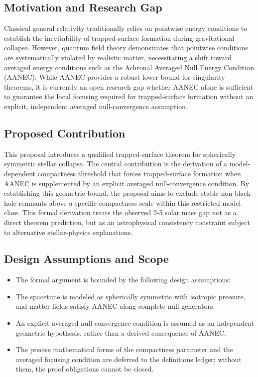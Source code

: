 \documentclass[conference]{IEEEtran}
\begin{document}
\subsection{Motivation and Research Gap}
Classical general relativity traditionally relies on pointwise energy conditions to establish the inevitability of trapped-surface formation during gravitational collapse. However, quantum field theory demonstrates that pointwise conditions are systematically violated by realistic matter, necessitating a shift toward averaged energy conditions such as the Achronal Averaged Null Energy Condition (AANEC). While AANEC provides a robust lower bound for singularity theorems, it is currently an open research gap whether AANEC alone is sufficient to guarantee the local focusing required for trapped-surface formation without an explicit, independent averaged null-convergence assumption.~\cite{cite_0ed84243cf171bc4}

\subsection{Proposed Contribution}
This proposal introduces a qualified trapped-surface theorem for spherically symmetric stellar collapse. The central contribution is the derivation of a model-dependent compactness threshold that forces trapped-surface formation when AANEC is supplemented by an explicit averaged null-convergence condition. By establishing this geometric bound, the proposal aims to exclude stable non-black-hole remnants above a specific compactness scale within this restricted model class. This formal derivation treats the observed 2-5 solar mass gap not as a direct theorem prediction, but as an astrophysical consistency constraint subject to alternative stellar-physics explanations.

\subsection{Design Assumptions and Scope}
\begin{itemize}
\item The formal argument is bounded by the following design assumptions:
\item The spacetime is modeled as spherically symmetric with isotropic pressure, and matter fields satisfy AANEC along complete null generators.
\item An explicit averaged null-convergence condition is assumed as an independent geometric hypothesis, rather than a derived consequence of AANEC.
\item The precise mathematical forms of the compactness parameter and the averaged focusing condition are deferred to the definitions ledger; without them, the proof obligations cannot be closed.
\end{itemize}
\end{document}
